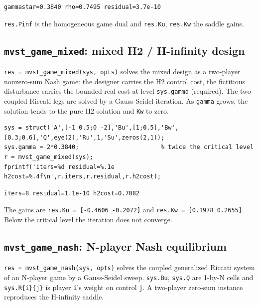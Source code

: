 \documentclass[11pt,oneside]{report}
\newcommand{\code}[1]{\texttt{#1}}
\begin{document}
\begin{lstlisting}[style=outputstyle]
gammastar=0.3840 rho=0.7495 residual=3.7e-10
\end{lstlisting}

\code{res.Pinf} is the homogeneous game dual and \code{res.Ku}, \code{res.Kw} the saddle gains.

\hypertarget{mvst_game_mixed-mixed-h2-h-infinity-design}{%
\subsection{\texorpdfstring{\code{mvst\_game\_mixed}: mixed H2 / H-infinity design}{mvst\_game\_mixed: mixed H2 / H-infinity design}}\label{mvst_game_mixed-mixed-h2-h-infinity-design}}

\code{res = mvst\_game\_mixed(sys, opts)} solves the mixed design as a two-player
nonzero-sum Nash game: the designer carries the H2 control cost, the fictitious
disturbance carries the bounded-real cost at level \code{sys.gamma} (required). The
two coupled Riccati legs are solved by a Gauss-Seidel iteration. As \code{gamma}
grows, the solution tends to the pure H2 solution and \code{Kw} to zero.

\begin{lstlisting}[style=matlabstyle]
sys = struct('A',[-1 0.5;0 -2],'Bu',[1;0.5],'Bw',[0.3;0.6],'Q',eye(2),'Ru',1,'Su',zeros(2,1));
sys.gamma = 2*0.3840;                       % twice the critical level
r = mvst_game_mixed(sys);
fprintf('iters=%d residual=%.1e h2cost=%.4f\n',r.iters,r.residual,r.h2cost);
\end{lstlisting}

\begin{lstlisting}[style=outputstyle]
iters=8 residual=1.1e-10 h2cost=0.7082
\end{lstlisting}

The gains are \code{res.Ku = [-0.4606 -0.2072]} and \code{res.Kw = [0.1978 0.2655]}. Below
the critical level the iteration does not converge.

\hypertarget{mvst_game_nash-n-player-nash-equilibrium}{%
\subsection{\texorpdfstring{\code{mvst\_game\_nash}: N-player Nash equilibrium}{mvst\_game\_nash: N-player Nash equilibrium}}\label{mvst_game_nash-n-player-nash-equilibrium}}

\code{res = mvst\_game\_nash(sys, opts)} solves the coupled generalized Riccati system
of an N-player game by a Gauss-Seidel sweep. \code{sys.Bu}, \code{sys.Q} are 1-by-N cells
and \code{sys.R\{i\}\{j\}} is player \code{i}'s weight on control \code{j}. A two-player zero-sum
instance reproduces the H-infinity saddle.
\end{document}
